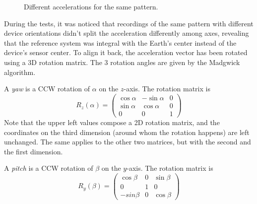 \begin{center}
	\begin{figure}[ht!]
		\caption{Different accelerations for the same pattern.}
	\end{figure}
\end{center}

During the tests, it was noticed that recordings of the same pattern with different device orientations didn't split the acceleration differently among axes, revealing that the reference system was integral with the Earth's center instead of the device's sensor center. To align it back, the acceleration vector has been rotated using a 3D rotation matrix. The 3 rotation angles are given by the Madgwick algorithm.
\bigbreak

A \textit{yaw} is a CCW rotation of $\alpha$ on the $z$-axis. The rotation matrix is
\[
	R_z(\alpha) =
	\begin{pmatrix}
		\cos\alpha & -\sin\alpha & 0 \\
		\sin\alpha & \cos\alpha & 0 \\
		0 & 0 & 1
	\end{pmatrix}
\]
Note that the upper left values compose a 2D rotation matrix, and the coordinates on the third dimension (around whom the rotation happens) are left unchanged. The same applies to the other two matrices, but with the second and the first dimension.
\bigbreak

A \textit{pitch} is a CCW rotation of $\beta$ on the $y$-axis. The rotation matrix is
\[
	R_y(\beta) =
	\begin{pmatrix}
		\cos\beta & 0 & \sin\beta \\
		0 & 1 & 0 \\
		-sin\beta & 0 & \cos\beta
	\end{pmatrix}
\]

